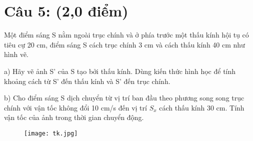 \documentclass[50pt]{article}
\begin{document}
\section*{\color[HTML]{4287f5}Câu 5: (2,0 điểm)}
Một điểm sáng S nằm ngoài trục chính và ở phía trước một thấu kính hội tụ có tiêu cự 20 cm, điểm sáng S cách trục chính 3 cm và cách thấu kính 40 cm như hình vẽ.

a) Hãy vẽ ảnh S’ của S tạo bởi thấu kính. Dùng kiến thức hình học để tính khoảng cách từ S’ đến thấu kính và S' đến trục chính.

b) Cho điểm sáng S dịch chuyển từ vị trí ban đầu theo phương song song trục chính với vận tốc không đổi 10 cm/s đến vị trí $S_{x}$ cách thấu kính 30 cm. Tính vận tốc của ảnh trong thời gian chuyển động.
\begin{figure}[H]
    \centering
    \texttt{[image: tk.jpg]}
    \label{fig:enter-label}
\end{figure}
\end{document}
